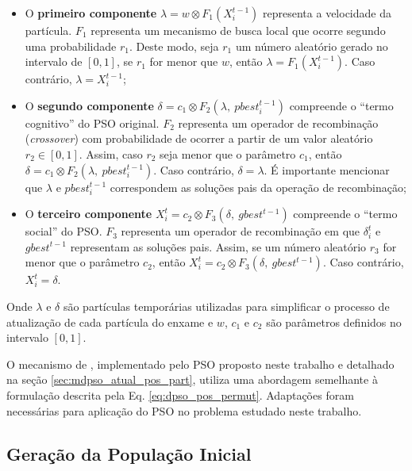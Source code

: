 \documentclass[
	12pt,				%
	openany,			%
	oneside,	
	a4paper,			%
	brazil,				%
	]{unimontes-ppgmsc-abntex2}
\begin{document}
\begin{itemize}
\item O \textbf{primeiro componente} $\lambda = w \otimes F_1(X^{t-1}_{i})$ representa a velocidade da partícula. $F_1$ representa um mecanismo de busca local que ocorre segundo uma probabilidade $r_1$. Deste modo, seja $r_1$ um número aleatório gerado no intervalo de $[0,1]$, se $r_1$ for menor que $w$, então $\lambda  = F_1(X^{t-1}_{i})$. Caso contrário, $\lambda = X^{t-1}_{i}$; 

\item O \textbf{segundo componente} $\delta = c_1 \otimes  F_2(\lambda,\ pbest^{t-1}_{i})$ compreende o ``termo cognitivo'' do PSO original. $F_2$ representa um operador de recombinação ({\em crossover}) com probabilidade de ocorrer a partir de um valor aleatório $r_2 \in [0,1]$. Assim, caso $r_2$ seja menor que o parâmetro $c_1$, então $\delta = c_1 \otimes  F_2(\lambda,\ pbest^{t-1}_{i})$. Caso contrário, $\delta = \lambda$. É importante mencionar que $\lambda$ e $pbest^{t-1}_{i}$ correspondem as soluções pais da operação de recombinação; 

\item O \textbf{terceiro componente} $X^{t}_{i} = c_2 \otimes F_3 (\delta,\ gbest ^{t-1})$ compreende o ``termo social'' do PSO. $F_3$ representa um operador de recombinação em que $\delta ^{t}_{i}$ e $gbest^{t-1}$ representam as soluções pais. Assim, se um número aleatório $r_3$ for menor que o parâmetro $c_2$, então $X^{t}_{i} = c_2 \otimes F_3 (\delta,\ gbest ^{t-1})$. Caso contrário, $X^{t}_{i} = \delta$.
\end{itemize}

Onde $\lambda$ e $\delta$ são partículas temporárias utilizadas para simplificar o processo de atualização de cada partícula do enxame e $w$, $c_1$ e $c_2$ são parâmetros definidos no intervalo $[0,1]$.


O mecanismo de , implementado pelo PSO proposto neste trabalho e detalhado na seção \ref{sec:mdpso_atual_pos_part}, utiliza uma abordagem semelhante à formulação descrita pela Eq. \ref{eq:dpso_pos_permut}. Adaptações foram necessárias para aplicação do PSO no problema estudado neste trabalho.


\subsection{Geração da População Inicial}
\label{sec:ger_inicial}
\end{document}
